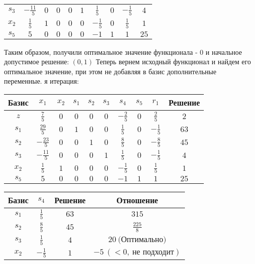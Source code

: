 \documentclass{article}%
\begin{document}
\begin{flushleft}
\begin{tabular}{|c|cccccccc|c|}
$s_{3}$&$-\frac{11}{5}$&$0$&$0$&$0$&$1$&$\frac{1}{5}$&$0$&$-\frac{1}{5}$&$4$\\%
$x_{2}$&$\frac{1}{5}$&$1$&$0$&$0$&$0$&$-\frac{1}{5}$&$0$&$\frac{1}{5}$&$1$\\%
$s_{5}$&$5$&$0$&$0$&$0$&$0$&$-1$&$1$&$1$&$25$\\%
\hline%
\end{tabular}%
\newline%
\newline%
Таким образом, получили оптимальное значение функционала {-} 0 и начальное допустимое решение: %
$(0, 1)$%
\newline%
Теперь вернем исходный функционал и найдем его оптимальное значение, при этом не добавляя в базис дополнительные переменные.%
я итерация: %
\newline%
\newline%
\renewcommand{\arraystretch}{1.3}%
\begin{tabular}{|c|cccccccc|c|}%
\hline%
Базис&$x_{1}$&$x_{2}$&$s_{1}$&$s_{2}$&$s_{3}$&$s_{4}$&$s_{5}$&$r_{1}$&Решение\\%
\hline%
$z$&$\frac{7}{5}$&$0$&$0$&$0$&$0$&$-\frac{2}{5}$&$0$&$\frac{2}{5}$&$2$\\%
\hline%
$s_{1}$&$\frac{29}{5}$&$0$&$1$&$0$&$0$&$\frac{1}{5}$&$0$&$-\frac{1}{5}$&$63$\\%
$s_{2}$&$-\frac{23}{5}$&$0$&$0$&$1$&$0$&$\frac{8}{5}$&$0$&$-\frac{8}{5}$&$45$\\%
$s_{3}$&$-\frac{11}{5}$&$0$&$0$&$0$&$1$&$\frac{1}{5}$&$0$&$-\frac{1}{5}$&$4$\\%
$x_{2}$&$\frac{1}{5}$&$1$&$0$&$0$&$0$&$-\frac{1}{5}$&$0$&$\frac{1}{5}$&$1$\\%
$s_{5}$&$5$&$0$&$0$&$0$&$0$&$-1$&$1$&$1$&$25$\\%
\hline%
\end{tabular}%
\newline%
\newline%
\newline%
\begin{tabular}{|cccc|}%
\hline%
Базис&$s_{4}$&Решение&Отношение\\%
\hline%
$s_{1}$&$\frac{1}{5}$&$63$&$315$\\%
$s_{2}$&$\frac{8}{5}$&$45$&$\frac{225}{8}$\\%
$s_{3}$&$\frac{1}{5}$&$4$&$20\: \text{(Оптимально)}$\\%
$x_{2}$&$-\frac{1}{5}$&$1$&$-5\: (< 0, \: \text{не подходит})$\\%

\end{tabular}
\end{flushleft}
\end{document}
